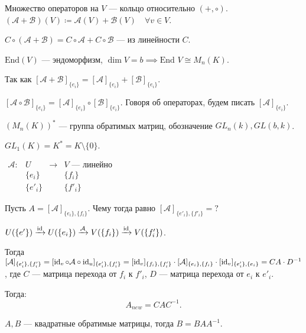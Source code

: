 Множество операторов на $V$ --- кольцо относительно  $(+, \circ)$.  $(\mathcal{A} + \mathcal{B})(V) \coloneqq \mathcal{A}(V) + \mathcal{B}(V) \quad \forall v \in V$.

$C \circ (\mathcal{A} + \mathcal{B}) = C \circ \mathcal{A} + C \circ \mathcal{B}$ --- из линейности $C$.

 \begin{definition}
     $\text{End}(V)$ --- эндоморфизм,  $\dim V = b \implies \text{End } V \cong M_n(K)$.
\end{definition}

Так как $[\mathcal{A} + \mathcal{B}]_{\{e_i\}} = [\mathcal{A}]_{\{e_i\}} + [\mathcal{B}]_{\{e_i\}}$.

$[\mathcal{A} \circ \mathcal{B}]_{\{e_i\}} = [\mathcal{A}]_{\{e_i\}} \circ [\mathcal{B}]_{\{e_i\}}$. Говоря об операторах, будем писать  $[\mathcal{A}]_{\{e_i\}}$.

$\left(M_n(K)\right)^*$ --- группа обратимых матриц, обозначение  $GL_n(k), GL(b, k)$.

\begin{example}
    $GL_1(K) = K^* = K \setminus \{0\}$.
\end{example}

$\begin{array}{llll} \mathcal{A}\!: & U & \to & V\text{ --- линейно} \\ & \{e_i\} && \{f_i\} \\ & \{e'_i\} && \{f'_i\} \end{array}$

Пусть  $A = [\mathcal{A}]_{\{e_i\}, \{f_i\}}$. Чему тогда равно  $[\mathcal{A}]_{\{e'_i\}, \{f'_i\}} = ?$

$U (\{e'\}) \xrightarrow{\operatorname{id}} U(\{e_i\}) \xrightarrow{\mathcal{A}} V (\{f_i\}) \xrightarrow{\operatorname{id}} V(\{f'_i\})$.

Тогда  $[\mathcal{A}]_{\{e'_i\}, \{f'_i\}} = [\operatorname{id}_v \circ \mathcal{A} \circ \operatorname{id}_u]_{\{e'_i\}, \{f'_i\}} = [\operatorname{id}_v]_{\{f_i\}, \{f'_i\}} \cdot [\mathcal{A}]_{\{e_i\}, \{f_i\}} \cdot [\operatorname{id}_v]_{\{e'_i\}, \{e_i\}} = C A \cdot D^{-1}$, где  $C$ --- матрица перехода от  $f_i$ к  $f'_i$,  $D$ --- матрица перехода  от $e_i$ к  $e'_i$.

Тогда:  \[
    A_{new} = C A C^{-1}
.\]

$A, B$ --- квадратные обратимые матрицы, тогда  $B = B A A^{-1}$.

